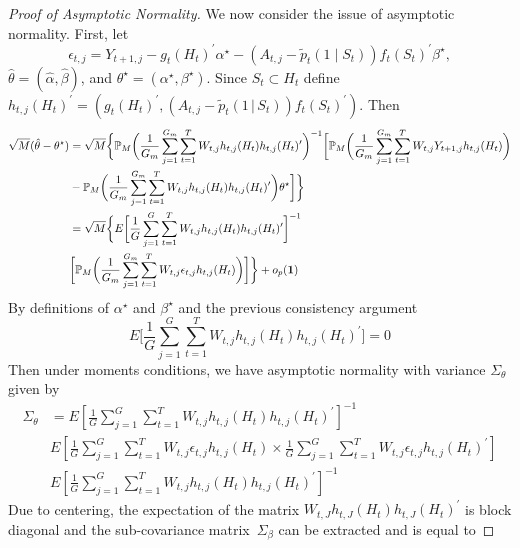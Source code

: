 \documentclass[12pt]{article}
\def\given{\, | \,}
\begin{document}
\begin{proof}[Proof of Asymptotic Normality]
We now consider the issue of asymptotic normality.  First, let
\[
\epsilon_{t,j} = Y_{t+1,j} - g_t(H_t)^{\prime} \alpha^\star - (A_{t,j}-\tilde{p}_t(1 \mid S_t)) f_t(S_t)^{\prime} \beta^\star,
\]
$\hat{\theta} = (\hat{\alpha}, \hat{\beta})$, and $\theta^\star = (\alpha^\star, \beta^\star)$.
Since $S_t \subset H_t$ define $h_{t,j}(H_t)^\prime = (g_t(H_t)^\prime, (A_{t,j}-\tilde{p}_t(1 \given S_t)) f_t(S_t)^\prime)$. Then
\begin{align*}
\sqrt{M} ( \hat{\theta} - \theta^\star )
  &= \sqrt{M} \bigg \{ \mathbb{P}_M \bigg( \frac{1}{G_m} \sum_{j=1}^{G_m} \sum_{t=1}^T W_{t,j} h_{t,j}(H_t) h_{t,j}(H_t)^\prime \bigg)^{-1} \bigg[
    \mathbb{P}_M \bigg( \frac{1}{G_m} \sum_{j=1}^{G_m} \sum_{t=1}^T W_{t,j}
    Y_{t+1,j} h_{t,j}(H_t) \bigg) \\
  &- \mathbb{P}_M \bigg( \frac{1}{G_m} \sum_{j=1}^{G_m}
  \sum_{t=1}^T W_{t,j} h_{t,j}(H_t) h_{t,j}(H_t)^\prime \bigg)
    \theta^\star \bigg] \bigg \} \\
  &= \sqrt{M} \bigg \{ E \bigg[
  \frac{1}{G} \sum_{j=1}^G \sum_{t=1}^T W_{t,j} h_{t,j}(H_t)
  h_{t,j}(H_t)^\prime \bigg]^{-1} \\
  &\bigg[ \mathbb{P}_M \bigg( \frac{1}{G_m} \sum_{j=1}^{G_m} \sum_{t=1}^T
    W_{t,j} \epsilon_{t,j} h_{t,j}(H_t) \bigg) \bigg] \bigg \} + o_p ( {\bf 1} )
\end{align*}
By definitions of $\alpha^\star$ and $\beta^\star$ and the previous consistency argument
\[
E \bigg[
  \frac{1}{G} \sum_{j=1}^G \sum_{t=1}^T W_{t,j} h_{t,j}(H_t)
  h_{t,j}(H_t)^\prime \bigg]  = 0
\]
Then under moments conditions, we have asymptotic normality with variance $\Sigma_{\theta}$ given by
\begin{align*}
\Sigma_{\theta} &= E \left[ \frac{1}{G} \sum_{j=1}^G \sum_{t=1}^T W_{t,j} h_{t,j}(H_t) h_{t,j}(H_t)^\prime \right]^{-1} \\
                &E \left[ \frac{1}{G} \sum_{j=1}^G \sum_{t=1}^T W_{t,j} \epsilon_{t,j} h_{t,j}(H_t)
                  \times  \frac{1}{G} \sum_{j=1}^G \sum_{t=1}^T W_{t,j} \epsilon_{t,j} h_{t,j}(H_t)^\prime \right] \\
                &E \left[ \frac{1}{G} \sum_{j=1}^G \sum_{t=1}^T W_{t,j} h_{t,j}(H_t) h_{t,j}(H_t)^\prime \right]^{-1}
\end{align*}
Due to centering, the expectation of the matrix
$W_{t,J} h_{t,J}(H_t) h_{t,J} (H_t)^\prime$ is block diagonal and
the sub-covariance matrix~$\Sigma_{\beta}$ can be extracted and is equal to

\end{proof}
\end{document}
